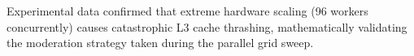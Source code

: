 \documentclass[12pt,a4wide]{report}
\begin{document}
Experimental data confirmed that extreme hardware scaling (96 workers concurrently) causes catastrophic L3 cache thrashing, mathematically validating the moderation strategy taken during the parallel grid sweep.

\clearpage

\tableofcontents
\clearpage
\listoffigures
\clearpage
\listoftables
\clearpage

\setcounter{page}{1}













\nocite{*}


\end{document}
